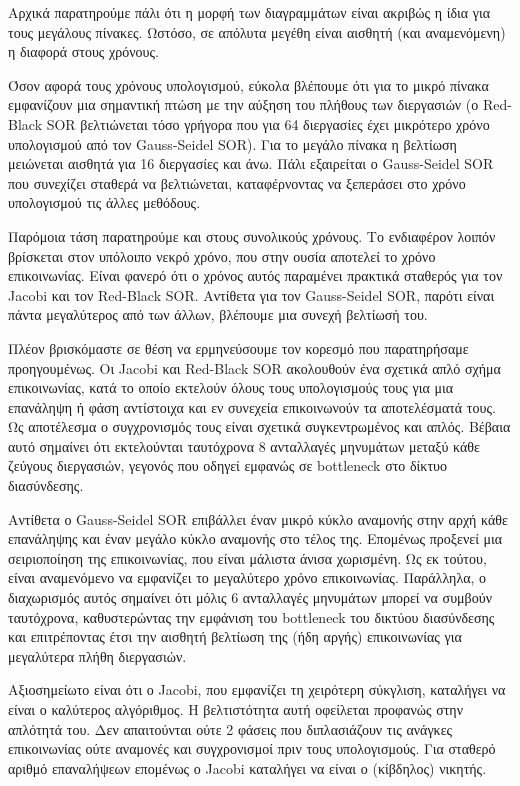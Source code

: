 \documentclass[12pt,titlepage]{article}
\begin{document}
Αρχικά παρατηρούμε πάλι ότι η μορφή των διαγραμμάτων είναι ακριβώς η ίδια για
τους μεγάλους πίνακες. Ωστόσο, σε απόλυτα μεγέθη είναι αισθητή (και αναμενόμενη)
η διαφορά στους χρόνους.

Όσον αφορά τους χρόνους υπολογισμού, εύκολα βλέπουμε ότι για το μικρό πίνακα
εμφανίζουν μια σημαντική πτώση με την αύξηση του πλήθους των διεργασιών (ο
Red-Black SOR βελτιώνεται τόσο γρήγορα που για 64 διεργασίες έχει μικρότερο
χρόνο υπολογισμού από τον Gauss-Seidel SOR). Για το μεγάλο πίνακα η βελτίωση
μειώνεται αισθητά για 16 διεργασίες και άνω. Πάλι εξαιρείται ο Gauss-Seidel SOR
που συνεχίζει σταθερά να βελτιώνεται, καταφέρνοντας να ξεπεράσει στο χρόνο
υπολογισμού τις άλλες μεθόδους.

Παρόμοια τάση παρατηρούμε και στους συνολικούς χρόνους. Το ενδιαφέρον λοιπόν
βρίσκεται στον υπόλοιπο νεκρό χρόνο, που στην ουσία αποτελεί το χρόνο
επικοινωνίας. Είναι φανερό ότι ο χρόνος αυτός παραμένει πρακτικά σταθερός για
τον Jacobi και τον Red-Black SOR. Αντίθετα για τον Gauss-Seidel SOR, παρότι
είναι πάντα μεγαλύτερος από των άλλων, βλέπουμε μια συνεχή βελτίωσή του.

Πλέον βρισκόμαστε σε θέση να ερμηνεύσουμε τον κορεσμό που παρατηρήσαμε
προηγουμένως. Οι Jacobi και Red-Black SOR ακολουθούν ένα σχετικά απλό σχήμα
επικοινωνίας, κατά το οποίο εκτελούν όλους τους υπολογισμούς τους για μια
επανάληψη ή φάση αντίστοιχα και εν συνεχεία επικοινωνούν τα αποτελέσματά τους.
Ως αποτέλεσμα ο συγχρονισμός τους είναι σχετικά συγκεντρωμένος και απλός. Βέβαια 
αυτό σημαίνει ότι εκτελούνται ταυτόχρονα 8 ανταλλαγές μηνυμάτων μεταξύ κάθε
ζεύγους διεργασιών, γεγονός που οδηγεί εμφανώς σε bottleneck στο δίκτυο
διασύνδεσης.

Αντίθετα ο Gauss-Seidel SOR επιβάλλει έναν μικρό κύκλο αναμονής στην αρχή κάθε
επανάληψης και έναν μεγάλο κύκλο αναμονής στο τέλος της. Επομένως προξενεί μια
σειριοποίηση της επικοινωνίας, που είναι μάλιστα άνισα χωρισμένη. Ως εκ τούτου,
είναι αναμενόμενο να εμφανίζει το μεγαλύτερο χρόνο επικοινωνίας. Παράλληλα, ο
διαχωρισμός αυτός σημαίνει ότι μόλις 6 ανταλλαγές μηνυμάτων μπορεί να συμβούν
ταυτόχρονα, καθυστερώντας την εμφάνιση του bottleneck του δικτύου διασύνδεσης
και επιτρέποντας έτσι την αισθητή βελτίωση της (ήδη αργής) επικοινωνίας για
μεγαλύτερα πλήθη διεργασιών.

Αξιοσημείωτο είναι ότι ο Jacobi, που εμφανίζει τη χειρότερη σύκγλιση, καταλήγει
να είναι ο καλύτερος αλγόριθμος. Η βελτιστότητα αυτή οφείλεται προφανώς στην
απλότητά του. Δεν απαιτούνται ούτε 2 φάσεις που διπλασιάζουν τις ανάγκες
επικοινωνίας ούτε αναμονές και συγχρονισμοί πριν τους υπολογισμούς. Για σταθερό
αριθμό επαναλήψεων επομένως ο Jacobi καταλήγει να είναι ο (κίβδηλος) νικητής.
\end{document}
